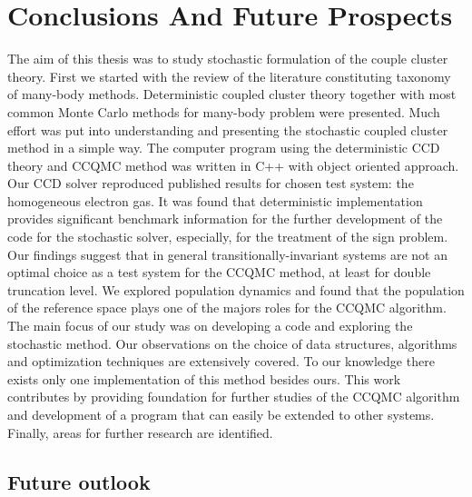 \documentclass[twoside,english]{uiofysmaster}
\begin{document}
\chapter{Conclusions And Future Prospects}

The aim of this thesis was to study stochastic formulation of the couple cluster theory. 
First we started with the review of the literature constituting taxonomy of many-body methods.
Deterministic coupled cluster theory together with most common Monte Carlo methods for many-body problem were presented. Much effort was put into understanding and presenting the stochastic coupled cluster method in a simple way.
The computer program using the deterministic CCD theory and CCQMC method was written in C++ with object oriented approach. Our CCD solver reproduced published results for chosen test system: the homogeneous electron gas. It was found that deterministic implementation provides significant benchmark information for the further development of the code for the stochastic solver, especially, for the treatment of the sign problem. Our findings suggest that in general transitionally-invariant systems are not an optimal choice as a test system for the CCQMC method, at least for double truncation level. We explored population dynamics and found that the population of the reference space plays one of the majors roles for the CCQMC algorithm.
The main focus of our study was on developing a code and exploring the stochastic method.
Our observations on the choice of data structures, algorithms and optimization techniques are extensively covered. To our knowledge there exists only one implementation of this method besides ours.
This work contributes by providing foundation for further studies of the CCQMC algorithm and development of a program that can easily be extended to other systems.
Finally, areas for further research are identified.




\section{Future outlook}
\end{document}

